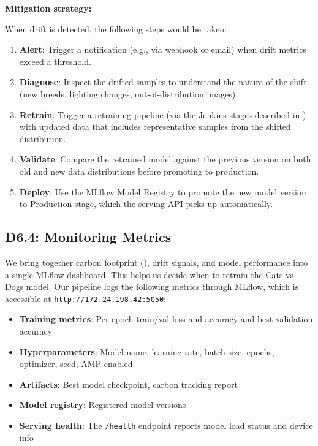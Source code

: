 \documentclass[10pt,twocolumn,letterpaper]{article}
\begin{document}
\textbf{Mitigation strategy:}

When drift is detected, the following steps would be taken:
\begin{enumerate}
    \item \textbf{Alert}: Trigger a notification (e.g., via webhook or email) when drift metrics exceed a threshold.
    \item \textbf{Diagnose}: Inspect the drifted samples to understand the nature of the shift (new breeds, lighting changes, out-of-distribution images).
    \item \textbf{Retrain}: Trigger a retraining pipeline (via the Jenkins stages described in ) with updated data that includes representative samples from the shifted distribution.
    \item \textbf{Validate}: Compare the retrained model against the previous version on both old and new data distributions before promoting to production.
    \item \textbf{Deploy}: Use the MLflow Model Registry to promote the new model version to Production stage, which the serving API picks up automatically.
\end{enumerate}

\subsection{D6.4: Monitoring Metrics}

We bring together carbon footprint (), drift signals, and model performance into a single MLflow dashboard. This helps us decide when to retrain the Cats vs Dogs model. Our pipeline logs the following metrics through MLflow, which is accessible at \texttt{http://172.24.198.42:5050}:

\begin{itemize}
    \item \textbf{Training metrics}: Per-epoch train/val loss and accuracy and best validation accuracy
    \item \textbf{Hyperparameters}: Model name, learning rate, batch size, epochs, optimizer, seed, AMP enabled
    \item \textbf{Artifacts}: Best model checkpoint, carbon tracking report
    \item \textbf{Model registry}: Registered model versions
    \item \textbf{Serving health}: The \texttt{/health} endpoint reports model load status and device info
\end{itemize}
\end{document}
